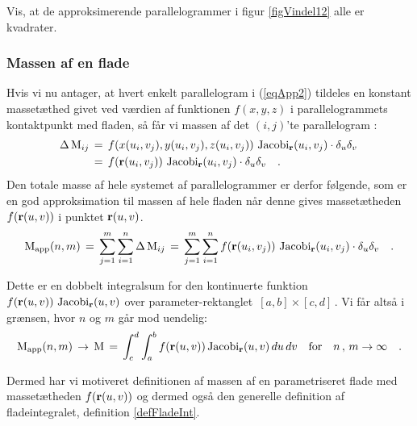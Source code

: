 \begin{exercise}\label{exerVindelApp}
Vis, at de approksimerende parallelogrammer i
figur \ref{figVindel12} alle er kvadrater.
\end{exercise}





\subsubsection{Massen af en flade}\label{subsubsecMasseFlade}
Hvis vi nu antager, at
hvert enkelt parallelogram i (\ref{eqApp2})
tildeles en konstant massetæthed givet ved
værdien af funktionen $f(x,y,z)$ i
parallelogrammets kontaktpunkt med fladen, så får
vi massen af det $(i, j)$'te parallelogram :
\begin{equation}
\begin{aligned}
\Delta \operatorname{M}_{ij} \, &= \, f(x(u_{i}, v_{j}), y(u_{i}, v_{j}), z(u_{i},
v_{j})) \, \operatorname{Jacobi}_{\bf r}(u_{i}, v_{j}) \cdot\delta_{u} \delta_{v} \, \\
&= \, f( {\bf r}(u_{i}, v_{j})) \, \operatorname{Jacobi}_{\bf r}(u_{i}, v_{j})
\cdot\delta_{u} \delta_{v}\quad .
\end{aligned}
\end{equation}
Den totale masse af hele systemet af
parallelogrammer er derfor følgende, som er en
god ap\-proksimation til massen af hele fladen
når denne gives massetætheden $f({\bf r}(u,v))$ i
punktet ${\bf r}(u,v)$.
\begin{equation}
\operatorname{M}_{\operatorname{app}}(n,m) \, = \,  \sum_{j=1}^{m} \sum_{i=1}^{n} \Delta \operatorname{M}_{ij} \,
= \, \sum_{j=1}^{m}\sum_{i=1}^{n}f({\bf r}(u_{i},
v_{j}))\,\operatorname{Jacobi}_{\bf r}(u_{i}, v_{j}) \cdot \delta_{u} \delta_{v}
\quad .
\end{equation}

Dette er en dobbelt integralsum for den kontinuerte funktion $f({\bf
r}(u,v))\,\operatorname{Jacobi}_{\bf r}(u, v)$ over parameter-rektanglet $\,[a,
b]\times[c, d]\,$. Vi får altså i grænsen, hvor $n$ og $m$ går mod
uendelig:
\begin{equation}
\operatorname{M}_{\operatorname{app}}(n,m)\, \to \, \operatorname{M} \, = \, \int_{c}^{d}\int_{a}^{b}f({\bf r}(u,
v ))\operatorname{Jacobi}_{\bf r}(u, v)\,du \,dv \quad \text{for} \quad n\, , \, m \to
\infty \quad.
\end{equation}

Dermed har vi motiveret definitionen af massen af en
parametriseret flade med massetætheden $f({\bf r}(u, v))$ og
dermed også den generelle definition af fladeintegralet,
definition \ref{defFladeInt}.

